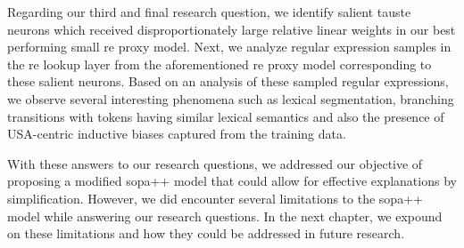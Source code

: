 Regarding our third and final research question, we identify salient \ac{tauste}
neurons which received disproportionately large relative linear weights in our
best performing small \ac{re} proxy model. Next, we analyze regular expression
samples in the \ac{re} lookup layer from the aforementioned \ac{re} proxy model
corresponding to these salient neurons. Based on an analysis of these sampled
regular expressions, we observe several interesting phenomena such as lexical
segmentation, branching transitions with tokens having similar lexical semantics
and also the presence of USA-centric inductive biases captured from the training
data.

\clearpage

With these answers to our research questions, we addressed our objective of
proposing a modified \ac{sopa}++ model that could allow for effective
explanations by simplification. However, we did encounter several limitations to
the \ac{sopa}++ model while answering our research questions. In the next
chapter, we expound on these limitations and how they could be addressed in
future research.

